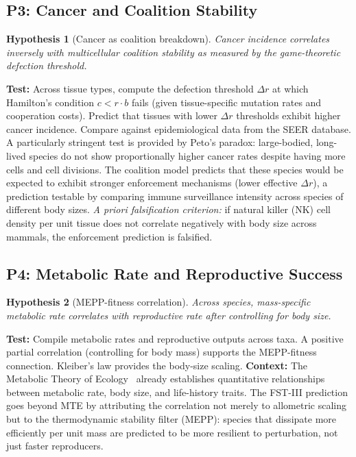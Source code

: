 \documentclass[12pt,a4paper]{article}
\newtheorem{hypothesis}{Hypothesis}
\theoremstyle{remark}
\begin{document}
\subsection{P3: Cancer and Coalition Stability}

\begin{hypothesis}[Cancer as coalition breakdown]
Cancer incidence correlates inversely with multicellular coalition stability as measured by the game-theoretic defection threshold.
\end{hypothesis}

\textbf{Test:} Across tissue types, compute the defection threshold $\Delta r$ at which Hamilton's condition $c < r \cdot b$ fails (given tissue-specific mutation rates and cooperation costs). Predict that tissues with lower $\Delta r$ thresholds exhibit higher cancer incidence. Compare against epidemiological data from the SEER database. A particularly stringent test is provided by Peto's paradox: large-bodied, long-lived species do not show proportionally higher cancer rates despite having more cells and cell divisions. The coalition model predicts that these species would be expected to exhibit stronger enforcement mechanisms (lower effective $\Delta r$), a prediction testable by comparing immune surveillance intensity across species of different body sizes. \textit{A priori falsification criterion:} if natural killer (NK) cell density per unit tissue does not correlate negatively with body size across mammals, the enforcement prediction is falsified.

\subsection{P4: Metabolic Rate and Reproductive Success}

\begin{hypothesis}[MEPP-fitness correlation]
Across species, mass-specific metabolic rate correlates with reproductive rate after controlling for body size.
\end{hypothesis}

\textbf{Test:} Compile metabolic rates and reproductive outputs across taxa. A positive partial correlation (controlling for body mass) supports the MEPP-fitness connection. Kleiber's law provides the body-size scaling. \textbf{Context:} The Metabolic Theory of Ecology~\citep{BrownMTE2004} already establishes quantitative relationships between metabolic rate, body size, and life-history traits. The FST-III prediction goes beyond MTE by attributing the correlation not merely to allometric scaling but to the thermodynamic stability filter (MEPP): species that dissipate more efficiently per unit mass are predicted to be more resilient to perturbation, not just faster reproducers.
\end{document}
